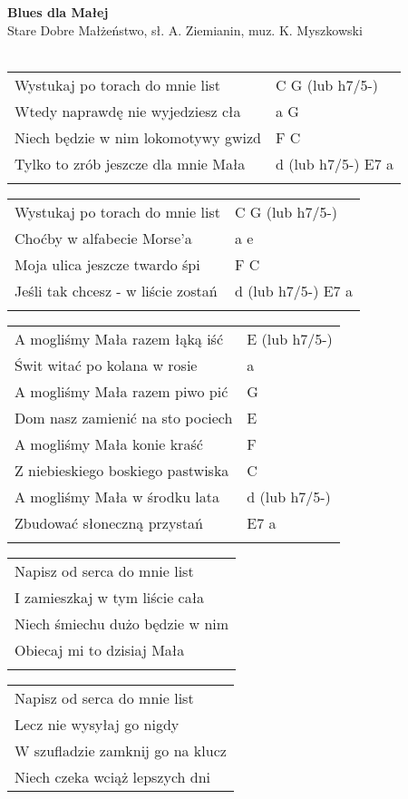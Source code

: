 \documentclass[a5paper]{article}
\begin{document}


\noindent
\fontsize{12pt}{15pt}\selectfont
\textbf{Blues dla Małej} \\
\fontsize{8pt}{10pt}\selectfont
Stare Dobre Małżeństwo, sł. A. Ziemianin, muz. K. Myszkowski \\ \\
\fontsize{10pt}{12pt}\selectfont
{}
\begin{tabular}{@{}p{8.5cm}p{3cm}@{}}
\noindent
Wystukaj po torach do mnie list & C G (lub h7/5-) \\
Wtedy naprawdę nie wyjedziesz cła & a G \\
Niech będzie w nim lokomotywy gwizd & F C \\
Tylko to zrób jeszcze dla mnie Mała & d (lub h7/5-) E7 a \\ \\
\end{tabular}

\noindent
\begin{tabular}{@{}p{8.5cm}p{3cm}@{}}
Wystukaj po torach do mnie list & C G (lub h7/5-)\\
Choćby w alfabecie Morse'a & a e \\
Moja ulica jeszcze twardo śpi & F C \\
Jeśli tak chcesz - w liście zostań & d (lub h7/5-) E7 a \\ \\
\end{tabular}

\noindent
\begin{tabular}{@{}p{7.5cm}p{3cm}@{}}
A mogliśmy Mała razem łąką iść & E (lub h7/5-)\\
Świt witać po kolana w rosie & a \\
A mogliśmy Mała razem piwo pić & G \\
Dom nasz zamienić na sto pociech & E \\
A mogliśmy Mała konie kraść & F \\
Z niebieskiego boskiego pastwiska & C \\
A mogliśmy Mała w środku lata & d (lub h7/5-)\\
Zbudować słoneczną przystań & E7 a \\ \\
\end{tabular}

\noindent
\begin{tabular}{@{}p{9.5cm}@{}}
Napisz od serca do mnie list \\
I zamieszkaj w tym liście cała \\
Niech śmiechu dużo będzie w nim \\
Obiecaj mi to dzisiaj Mała \\ \\
\end{tabular}

\noindent
\begin{tabular}{@{}p{9.5cm}@{}}
Napisz od serca do mnie list \\
Lecz nie wysyłaj go nigdy \\
W szufladzie zamknij go na klucz \\
Niech czeka wciąż lepszych dni
\end{tabular}
\end{document}
